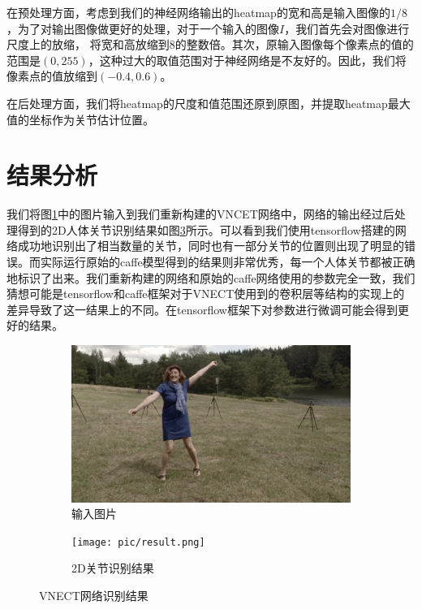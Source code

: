 \documentclass[a4paper, 10pt]{ctexart}
\begin{document}
在预处理方面，考虑到我们的神经网络输出的heatmap的宽和高是输入图像的$1/8$，为了对输出图像做更好的处理，对于一个输入的图像$I$，我们首先会对图像进行尺度上的放缩，
将宽和高放缩到$8$的整数倍。其次，原输入图像每个像素点的值的范围是$(0,255)$，这种过大的取值范围对于神经网络是不友好的。因此，我们将像素点的值放缩到$(-0.4,0.6)$。

在后处理方面，我们将heatmap的尺度和值范围还原到原图，并提取heatmap最大值的坐标作为关节估计位置。

\section{结果分析}
我们将图\ref{pic:input}中的图片输入到我们重新构建的VNCET网络中，网络的输出经过后处理得到的2D人体关节识别结果如图\ref{pic:result}所示。可以看到我们使用tensorflow搭建的网络成功地识别出了相当数量的关节，同时也有一部分关节的位置则出现了明显的错误。而实际运行原始的caffe模型得到的结果则非常优秀，每一个人体关节都被正确地标识了出来。我们重新构建的网络和原始的caffe网络使用的参数完全一致，我们猜想可能是tensorflow和caffe框架对于VNECT使用到的卷积层等结构的实现上的差异导致了这一结果上的不同。在tensorflow框架下对参数进行微调可能会得到更好的结果。

\begin{figure}[!ht]
        \begin{subfigure}[b]{0.5\textwidth}
                \includegraphics[width=\textwidth]{pic/input.jpg}
                \caption{输入图片}
                \label{pic:input}
        \end{subfigure}
        \hfill
        \begin{subfigure}[b]{0.5\textwidth}
                \texttt{[image: pic/result.png]}
                \caption{2D关节识别结果}
                \label{pic:result}
        \end{subfigure}
        \caption{VNECT网络识别结果}
\end{figure}
\end{document}

